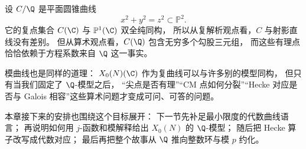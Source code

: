 \begin{example}[为什么有理点是额外信息]
\label{ex:ch07-rational-points-extra-data}
设 $C/\Q$ 是平面圆锥曲线
\[
  x^2+y^2=z^2\subset \mathbb P^2.
\]
它的复点集合 $C(\C)$ 与 $\mathbb P^1(\C)$ 双全纯同构，
所以从复解析观点看，$C$ 与射影直线没有差别。
但从算术观点看，$C(\Q)$ 包含无穷多个勾股三元组，
而这些有理点恰恰依赖于方程系数来自 $\Q$ 这一事实。

模曲线也是同样的道理：
$X_0(N)(\C)$ 作为复曲线可以与许多别的模型同构，
但只有当我们固定了 $\Q$-模型之后，
“尖点是否有理”“CM 点如何分裂”“Hecke 对应是否与 Galois 相容”这些算术问题才变成可问、可答的问题。
\end{example}

本章接下来的安排也围绕这个目标展开：
下一节先补足最小限度的代数曲线语言；
再说明如何用 $j$-函数和模解释给出 $X_0(N)$ 的 $\Q$-模型；
随后把 Hecke 算子改写成代数对应；
最后再把整个故事从 $\Q$ 推向整数环与模 $p$ 约化。
